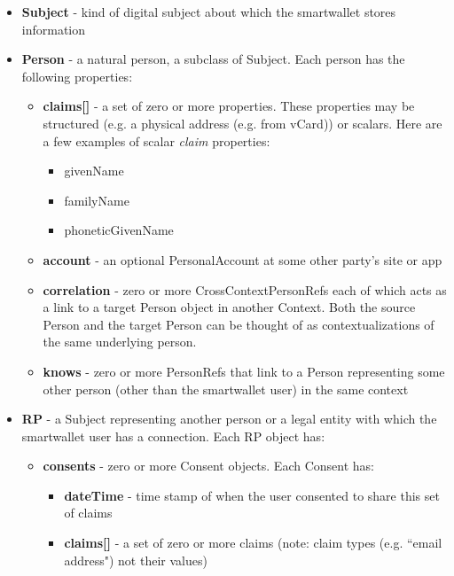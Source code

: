 \documentclass[11pt, oneside]{article}   	%
\begin{document}
\begin{itemize}
\item \textbf{Subject} - kind of digital subject about which the smartwallet stores information
\item \textbf{Person} - a natural person, a subclass of Subject. Each person has the following properties:
	\begin{itemize}
	\item \textbf{claims[]} - a set of zero or more properties. These properties may be structured (e.g. a physical address (e.g. from vCard)) or scalars. Here are a few examples of scalar \emph{claim} properties: 
		\begin{itemize}
		\item givenName
		\item familyName
		\item phoneticGivenName
		\end{itemize}
	\item \textbf{account} - an optional PersonalAccount at some other party's site or app
	\item \textbf{correlation} - zero or more CrossContextPersonRefs each of which acts as a link to a target Person object in another Context. Both the source Person and the target Person can be thought of as contextualizations of the same underlying person.
	\item \textbf{knows} - zero or more PersonRefs that link to a Person representing some other person (other than the  smartwallet user) in the same context
	\end{itemize}
\item \textbf{RP} - a Subject representing another person or a legal entity with which the smartwallet user has a connection. Each RP object has:
	\begin {itemize}
	\item \textbf{consents} - zero or more Consent objects. Each Consent has:
		\begin{itemize}
		\item \textbf{dateTime} - time stamp of when the user consented to share this set of claims
		\item \textbf{claims[]}  - a set of zero or more claims (note: claim types (e.g. ``email address") not their values)
		\end{itemize}
	\end{itemize}
\end{itemize}

\end{document}
